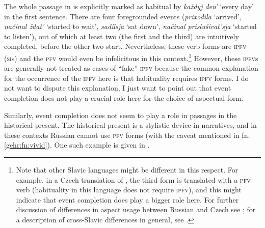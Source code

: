 \documentclass[output=paper]{langscibook}
\begin{document}
\noindent The whole passage in  is explicitly marked as habitual by \textit{každyj den'} `every day' in the first sentence. There are four foregrounded events (\textit{prixodila} `arrived', \textit{načinal ždat'} `started to wait', \textit{sadilsja} `sat down', \textit{načinal prislušivat'sja} `started to listen'), out of which at least two (the first and the third) are intuitively completed, before the other two start. Nevertheless, these verb forms are \textsc{ipfv} (\textsc{si}s) and the \textsc{pfv} would even be infelicitous in this context.\footnote{Note that other Slavic languages might be different in this respect. For example, in a Czech translation of , the third form is translated with a \textsc{pfv} verb (habituality in this language does not require \textsc{ipfv}), and this might indicate that event completion does play a bigger role here. For further discussion of differences in aspect usage between Russian and Czech see \citet{gehrke02,gehrke22%
}; for a description of cross-Slavic differences in general, see \citet{dickey00}.} However, these \textsc{ipfv}s are generally not treated as cases of ``fake'' \textsc{ipfv} because the common explanation for the occurrence of the \textsc{ipfv} here is that habituality requires \textsc{ipfv} forms. I do not want to dispute this explanation, I just want to point out that event completion does not play a crucial role here for the choice of aspectual form.  

Similarly, event completion does not seem to play a role in passages in the historical present. The historical present is a stylistic device in narratives, and in these contexts Russian cannot use \textsc{pfv} forms (with the caveat mentioned in fn. \ref{gehr:fn:vivid}). One such example is given in .

\label{gehr:ex:HP} 
\z
\end{document}
